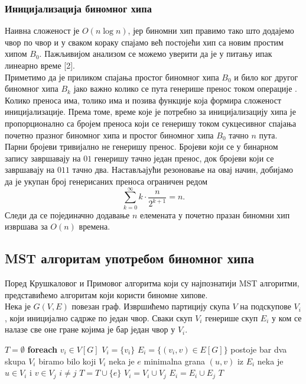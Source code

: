 \documentclass[11pt, a4paper]{article}
\theoremstyle{remark}
\numberwithin{equation}{section}
\begin{document}
	\subsubsection{Иницијализација биномног хипа}
	Наивна сложеност је $O(n \log n)$, јер биномни хип правимо тако што додајемо чвор по чвор и у сваком кораку спајамо већ постојећи хип са новим простим хипом $B_0$. Пажљивијом анализом се можемо уверити да је у питању ипак линеарно време [2]. \\
	\indent Приметимо да је приликом спајања простог биномног хипа $B_0$ и било ког другог биномног хипа $B_k$ јако важно колико се пута генерише пренос током операције . Колико преноса има, толико има и позива функције  која формира сложеност иницијализације. Према томе, време које је потребно за иницијализацију хипа је пропорционално са бројем преноса који се генеришу током сукцесивног спајања почетно празног биномног хипа и простог биномног хипа $B_0$ тачно $n$ пута. \\
	\indent Парни бројеви тривијално не генеришу пренос. Бројеви који се у бинарном запису завршавају на $01$ генеришу тачно један пренос, док бројеви који се завршавају на $011$ тачно два. Настављајући резоновање на овај начин, добијамо да је укупан број генерисаних преноса ограничен редом
	\begin{equation*}
	\sum_{k=0}^{\infty} k \cdot \frac{n}{2^{k+1}}=n.
	\end{equation*}
	\indent Следи да се појединачно додавање $n$ елемената у почетно празан биномни хип извршава за $O(n)$ времена.
	
	
	\subsection{MST алгоритам употребом биномног хипа}
	Поред Крушкаловог и Примовог алгоритма који су најпознатији MST алгоритми, представићемо алгоритам који користи биномне хипове. \\
	
	\noindent Нека је $G(V, E)$ повезан граф. Извршићемо партицију скупа $V$ на подскупове $V_i$, који иницијално садрже по један чвор. Сваки скуп $V_i$ генерише скуп $E_i$ у ком се налазе све оне гране којима је бар један чвор у $V_i$.
	
	\begin{codebox}
		\li $T=\emptyset$
		\li \textbf{foreach} $v_i \in V[G]$
		\li \Do $V_i=\{v_i\}$
		\li $E_i=\{(v_i, v) \in E[G] \}$
		\End
		\li \While postoje bar dva skupa $V_i$
		\li \Do biramo bilo koji $V_i$
		\li \Do neka je $e$ minimalna grana $(u, v)$ iz $E_i$
		\li neka je $u \in V_i$ i $v \in V_j$
		\li \If $i \neq j$
		\li \Do $T=T \cup \{e\}$
		\li $V_i=V_i \cup V_j$
		\li $E_i=E_i \cup E_j$
		\End
		\End
		\End
		\li \Return $T$
	\end{codebox}
\end{document}
